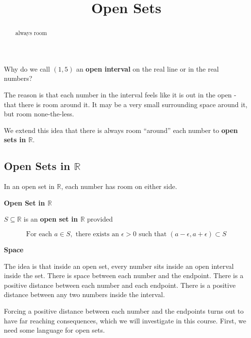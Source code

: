 \documentclass{ximera}
\title{Open Sets}
\begin{document}
\begin{abstract}
always room
\end{abstract}
\maketitle





Why do we call $(1, 5)$ an \textbf{open interval} on the real line or in the real numbers? 



The reason is that each number in the interval feels like it is out in the open - that there is room around it.  It may be a very small surrounding space around it, but room none-the-less.  


We extend this idea that there is always room ``around'' each number to \textbf{open sets in $\mathbb{R}$}.






\subsection*{Open Sets in $\mathbb{R}$}

In an open set in $\mathbb{R}$, each number has room on either side.  




\begin{definition}  \textbf{\textcolor{green!50!black}{Open Set in $\mathbb{R}$}}


$S \subseteq \mathbb{R}$ is an \textbf{open set in $\mathbb{R}$} provided 

\[
\text{For each } a \in S, \text{ there exists an } \epsilon > 0 \text{ such that }  (a - \epsilon, a + \epsilon) \subset S
\]

\end{definition}



\begin{idea}  \textbf{\textcolor{blue!55!black}{Space}}

The idea is that inside an open set, every number sits inside an open interval inside the set.  There is space between each number and the endpoint. There is a positive distance between each number and each endpoint. There is a positive distance between any two numbers inside the interval.
\end{idea}

Forcing a positive distance between each number and the endpoints turns out to have far reaching consequences, which we will investigate in this course.  First, we need some language for open sets. 
\end{document}
